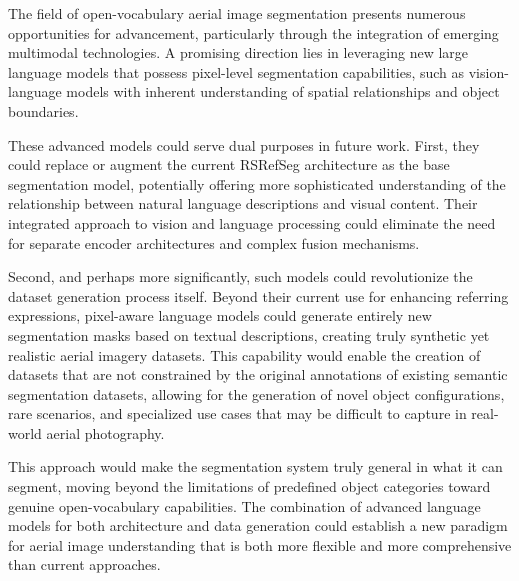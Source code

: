 The field of open-vocabulary aerial image segmentation presents numerous opportunities for advancement, particularly through the integration of emerging multimodal technologies. A promising direction lies in leveraging new large language models that possess pixel-level segmentation capabilities, such as vision-language models with inherent understanding of spatial relationships and object boundaries.

These advanced models could serve dual purposes in future work. First, they could replace or augment the current RSRefSeg architecture as the base segmentation model, potentially offering more sophisticated understanding of the relationship between natural language descriptions and visual content. Their integrated approach to vision and language processing could eliminate the need for separate encoder architectures and complex fusion mechanisms.

Second, and perhaps more significantly, such models could revolutionize the dataset generation process itself. Beyond their current use for enhancing referring expressions, pixel-aware language models could generate entirely new segmentation masks based on textual descriptions, creating truly synthetic yet realistic aerial imagery datasets. This capability would enable the creation of datasets that are not constrained by the original annotations of existing semantic segmentation datasets, allowing for the generation of novel object configurations, rare scenarios, and specialized use cases that may be difficult to capture in real-world aerial photography.

This approach would make the segmentation system truly general in what it can segment, moving beyond the limitations of predefined object categories toward genuine open-vocabulary capabilities. The combination of advanced language models for both architecture and data generation could establish a new paradigm for aerial image understanding that is both more flexible and more comprehensive than current approaches.

